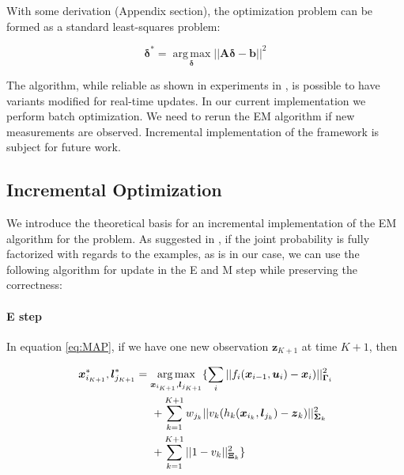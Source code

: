 With some derivation %
(Appendix section), the optimization problem can be formed as a standard least-squares problem:

\begin{equation}
\boldsymbol{\delta}^* = \operatorname*{arg\,max}_{\boldsymbol{\delta}}||\boldsymbol{A}\boldsymbol{\delta} - \boldsymbol{b}||^2
\label{eq:optimization}
\end{equation}


The algorithm, while reliable as shown in experiments in \cite{haehnel03iros}, is possible to have variants modified for real-time updates. In our current implementation we perform batch optimization. We need to rerun the EM algorithm if new measurements are observed. Incremental implementation of the framework is subject for future work.

\subsection{Incremental Optimization}
We introduce the theoretical basis for an incremental implementation of the EM algorithm for the problem. As suggested in \cite{neal1998EM}, if the joint probability is fully factorized with regards to the examples, as is in our case, we can use the following algorithm for update in the E and M step while preserving the correctness:

\paragraph{E step} 
In equation \ref{eq:MAP}, if we have one new observation $\boldsymbol{z}_{K+1}$ at time $K+1$, then

\begin{equation}
\begin{aligned}
\boldsymbol{x}_{i_{K+1}}^*, \boldsymbol{l}_{j_{K+1}}^*  
&= \operatorname*{arg\,max}_{ \boldsymbol{x}_{i_{K+1}}, \boldsymbol{l}_{j_{K+1}}} \{ 
\sum_{i}||f_i(\boldsymbol{x}_{i-1}, \boldsymbol{u}_i) - \boldsymbol{x}_i)||^2_{\boldsymbol{\Gamma}_i} \\
&\hspace{0.5cm}+ \sum_{k=1}^{K+1} w_{j_k}||v_k(h_k(\boldsymbol{x}_{i_k}, \boldsymbol{l}_{j_k}) - \boldsymbol{z}_k)||^2_{\boldsymbol{\Sigma}_k} \\ 
&\hspace{0.5cm}+ \sum_{k=1}^{K+1}||1-v_k||^2_{\boldsymbol{\Xi}_k} \}
\end{aligned}
\label{eq:facMAP}
\end{equation}

